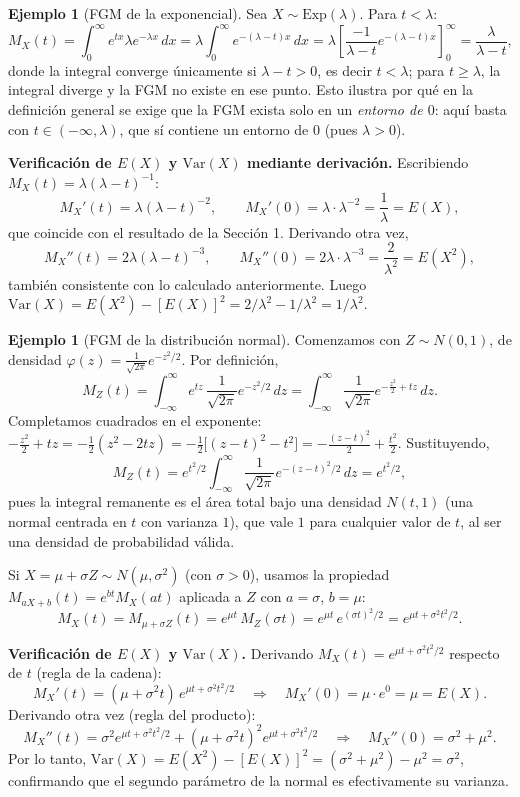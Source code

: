 \documentclass[11pt,a4paper]{article}
\theoremstyle{plain}
\theoremstyle{definition}
\newtheorem{ejemplo}[teorema]{Ejemplo}
\theoremstyle{remark}
\begin{document}
\begin{ejemplo}[FGM de la exponencial]
Sea $X\sim\text{Exp}(\lambda)$. Para $t<\lambda$:
\[
M_X(t) = \int_0^\infty e^{tx}\lambda e^{-\lambda x}\,dx = \lambda\int_0^\infty e^{-(\lambda-t)x}\,dx = \lambda\left[\frac{-1}{\lambda-t}e^{-(\lambda-t)x}\right]_0^\infty = \frac{\lambda}{\lambda-t},
\]
donde la integral converge únicamente si $\lambda-t>0$, es decir $t<\lambda$; para $t\geq\lambda$, la integral diverge y la FGM no existe en ese punto. Esto ilustra por qué en la definición general se exige que la FGM exista solo en un \emph{entorno de $0$}: aquí basta con $t\in(-\infty,\lambda)$, que sí contiene un entorno de $0$ (pues $\lambda>0$).

\textbf{Verificación de $E(X)$ y $\text{Var}(X)$ mediante derivación.} Escribiendo $M_X(t)=\lambda(\lambda-t)^{-1}$:
\[
M_X'(t) = \lambda(\lambda-t)^{-2}, \qquad M_X'(0) = \lambda\cdot\lambda^{-2} = \frac{1}{\lambda} = E(X),
\]
que coincide con el resultado de la Sección 1. Derivando otra vez,
\[
M_X''(t) = 2\lambda(\lambda-t)^{-3}, \qquad M_X''(0) = 2\lambda\cdot\lambda^{-3} = \frac{2}{\lambda^2} = E(X^2),
\]
también consistente con lo calculado anteriormente. Luego $\text{Var}(X)=E(X^2)-[E(X)]^2 = 2/\lambda^2 - 1/\lambda^2 = 1/\lambda^2$.
\end{ejemplo}

\begin{ejemplo}[FGM de la distribución normal]
Comenzamos con $Z\sim N(0,1)$, de densidad $\varphi(z)=\frac{1}{\sqrt{2\pi}}e^{-z^2/2}$. Por definición,
\[
M_Z(t) = \int_{-\infty}^\infty e^{tz}\,\frac{1}{\sqrt{2\pi}}e^{-z^2/2}\,dz = \int_{-\infty}^\infty \frac{1}{\sqrt{2\pi}} e^{-\frac{z^2}{2}+tz}\,dz.
\]
Completamos cuadrados en el exponente: $-\frac{z^2}{2}+tz = -\frac12(z^2-2tz) = -\frac12\big[(z-t)^2-t^2\big] = -\frac{(z-t)^2}{2}+\frac{t^2}{2}$. Sustituyendo,
\[
M_Z(t) = e^{t^2/2}\int_{-\infty}^\infty \frac{1}{\sqrt{2\pi}} e^{-(z-t)^2/2}\,dz = e^{t^2/2},
\]
pues la integral remanente es el área total bajo una densidad $N(t,1)$ (una normal centrada en $t$ con varianza $1$), que vale $1$ para cualquier valor de $t$, al ser una densidad de probabilidad válida.

Si $X=\mu+\sigma Z\sim N(\mu,\sigma^2)$ (con $\sigma>0$), usamos la propiedad $M_{aX+b}(t)=e^{bt}M_X(at)$ aplicada a $Z$ con $a=\sigma$, $b=\mu$:
\[
M_X(t) = M_{\mu+\sigma Z}(t) = e^{\mu t}\, M_Z(\sigma t) = e^{\mu t}\, e^{(\sigma t)^2/2} = e^{\mu t + \sigma^2 t^2/2}.
\]

\textbf{Verificación de $E(X)$ y $\text{Var}(X)$.} Derivando $M_X(t)=e^{\mu t+\sigma^2t^2/2}$ respecto de $t$ (regla de la cadena):
\[
M_X'(t) = (\mu+\sigma^2 t)\,e^{\mu t+\sigma^2t^2/2} \quad\Longrightarrow\quad M_X'(0) = \mu\cdot e^0 = \mu = E(X).
\]
Derivando otra vez (regla del producto):
\[
M_X''(t) = \sigma^2 e^{\mu t+\sigma^2t^2/2} + (\mu+\sigma^2t)^2 e^{\mu t+\sigma^2t^2/2} \quad\Longrightarrow\quad M_X''(0) = \sigma^2 + \mu^2.
\]
Por lo tanto, $\text{Var}(X)=E(X^2)-[E(X)]^2 = (\sigma^2+\mu^2)-\mu^2 = \sigma^2$, confirmando que el segundo parámetro de la normal es efectivamente su varianza.
\end{ejemplo}
\end{document}
